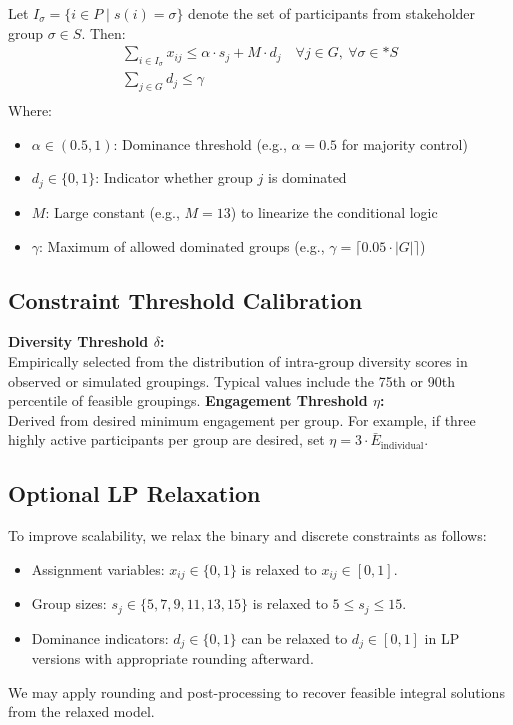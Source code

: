 Let \(I_\sigma = \{i \in P \mid s(i) = \sigma\}\) denote the set of participants from stakeholder group \(\sigma \in S\).
Then:
\begin{gather*}
    \sum_{i \in I_\sigma} x_{ij} \leq \alpha \cdot s_j + M \cdot d_j \quad \forall j \in G,\ \forall \sigma \in* S\\
    \sum_{j \in G} d_j \leq \gamma\\
\end{gather*}
\vspace{-0.5cm}
Where:
\begin{itemize}
    \item \(\alpha \in (0.5, 1)\): Dominance threshold (e.g., \(\alpha = 0.5\) for majority control)
    \item \(d_j \in \{0,1\}\): Indicator whether group \(j\) is dominated
    \item \(M\): Large constant (e.g., \(M = 13\)) to linearize the conditional logic
    \item \(\gamma\): Maximum of allowed dominated groups (e.g., \(\gamma = \lceil 0.05 \cdot |G| \rceil\))
\end{itemize}
\noindent
\subsection*{Constraint Threshold Calibration}
\textbf{Diversity Threshold \(\delta\):}\\[3pt]
Empirically selected from the distribution of intra-group diversity scores in observed or simulated groupings.
Typical values include the 75th or 90th percentile of feasible groupings.
\noindent
\textbf{Engagement Threshold \(\eta\):}\\[3pt]
Derived from desired minimum engagement per group.
For example, if three highly active participants per group are desired,
set \(\eta = 3 \cdot \bar{E}_{\text{individual}}\).

\subsection*{Optional LP Relaxation}

To improve scalability, we relax the binary and discrete constraints as follows:
\begin{itemize}
    \item Assignment variables: \quad $x_{ij} \in \{0,1\}$ is relaxed to $x_{ij} \in [0,1]$.
    \item Group sizes: \quad $s_j \in \{5,7,9,11,13,15\}$ is relaxed to $5 \leq s_j \leq 15$.
    \item Dominance indicators: \quad $d_j \in \{0,1\}$ can be relaxed to $d_j \in [0,1]$ in LP versions with appropriate rounding afterward.
\end{itemize}
We may apply rounding and post-processing to recover feasible integral solutions from the relaxed model.
